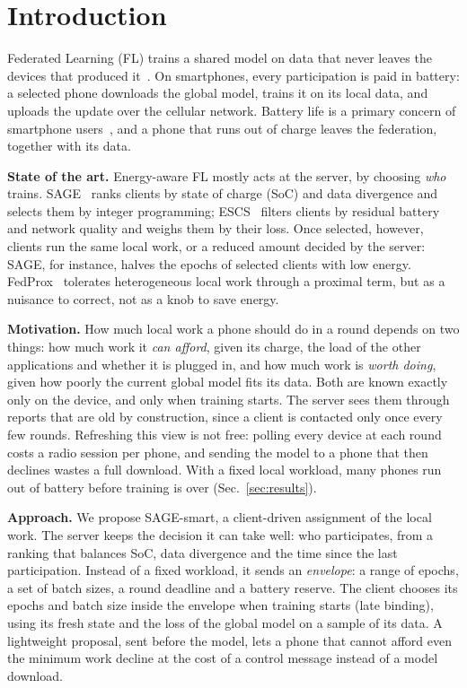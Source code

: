 \section{Introduction}\label{sec:intro}

Federated Learning (FL) trains a shared model on data that never leaves the
devices that produced it~\cite{mcmahan2017fedavg}. On smartphones, every
participation is paid in battery: a selected phone downloads the global model,
trains it on its local data, and uploads the update over the cellular network.
Battery life is a primary concern of smartphone users~\cite{ferreira2011battery},
and a phone that runs out of charge leaves the federation, together with its
data.

\textbf{State of the art.}
Energy-aware FL mostly acts at the server, by choosing \emph{who} trains.
SAGE~\cite{savoia2026sage} ranks clients by state of charge (SoC) and data
divergence and selects them by integer programming; ESCS~\cite{maciel2024escs}
filters clients by residual battery and network quality and weighs them by
their loss. Once selected, however, clients run the same local work, or a
reduced amount decided by the server: SAGE, for instance, halves the epochs of
selected clients with low energy. FedProx~\cite{li2020fedprox} tolerates
heterogeneous local work through a proximal term, but as a nuisance to
correct, not as a knob to save energy.

\textbf{Motivation.}
How much local work a phone should do in a round depends on two things: how
much work it \emph{can afford}, given its charge, the load of the other
applications and whether it is plugged in, and how much work is \emph{worth
doing}, given how poorly the current global model fits its data. Both are
known exactly only on the device, and only when training starts. The server
sees them through reports that are old by construction, since a client is
contacted only once every few rounds. Refreshing this view is not free:
polling every device at each round costs a radio session per phone, and
sending the model to a phone that then declines wastes a full download. With
a fixed local workload, many phones run out of battery before training is
over (Sec.~\ref{sec:results}).

\textbf{Approach.}
We propose SAGE-smart, a client-driven assignment of the local work. The server
keeps the decision it can take well: who participates, from a ranking that
balances SoC, data divergence and the time since the last participation.
Instead of a fixed workload, it sends an \emph{envelope}: a range of epochs, a
set of batch sizes, a round deadline and a battery reserve. The client chooses
its epochs and batch size inside the envelope when training starts (late
binding), using its fresh state and the loss of the global model on a sample
of its data. A lightweight proposal, sent before the model, lets a phone that
cannot afford even the minimum work decline at the cost of a control message
instead of a model download.

